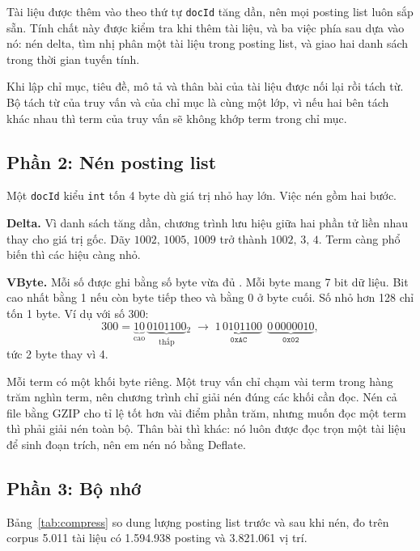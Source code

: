 \documentclass[9pt,twocolumn,a4paper]{extarticle}
\newcommand{\code}[1]{\texttt{#1}}
\newcommand{\srcref}[1]{\par\noindent\fcolorbox{red}{white}{\footnotesize\textbf{Mã nguồn: Listing~\ref{#1} (Phụ lục~\ref{app:code}).}}\par\vspace{3pt}}
\begin{document}
Tài liệu được thêm vào theo thứ tự \code{docId} tăng dần, nên mọi posting list luôn sắp sẵn. Tính chất này được kiểm tra khi thêm tài liệu, và ba việc phía sau dựa vào nó: nén delta, tìm nhị phân một tài liệu trong posting list, và giao hai danh sách trong thời gian tuyến tính.

Khi lập chỉ mục, tiêu đề, mô tả và thân bài của tài liệu được nối lại rồi tách từ. Bộ tách từ của truy vấn và của chỉ mục là cùng một lớp, vì nếu hai bên tách khác nhau thì term của truy vấn sẽ không khớp term trong chỉ mục.

\subsection{Phần 2: Nén posting list}
\label{sec:vbyte}
Một \code{docId} kiểu \code{int} tốn 4 byte dù giá trị nhỏ hay lớn. Việc nén gồm hai bước.

\textbf{Delta.} Vì danh sách tăng dần, chương trình lưu hiệu giữa hai phần tử liền nhau thay cho giá trị gốc. Dãy $1002,\,1005,\,1009$ trở thành $1002,\,3,\,4$. Term càng phổ biến thì các hiệu càng nhỏ.

\textbf{VByte.} Mỗi số được ghi bằng số byte vừa đủ \cite{manning2008ir}. Mỗi byte mang 7 bit dữ liệu. Bit cao nhất bằng 1 nếu còn byte tiếp theo và bằng 0 ở byte cuối. Số nhỏ hơn 128 chỉ tốn 1 byte. Ví dụ với số 300:
\begin{equation}
300=\underbrace{10}_{\text{cao}}\,\underbrace{0101100}_{\text{thấp}}{}_2
\;\longrightarrow\;
\underbrace{1\,0101100}_{\code{0xAC}}\ \ \underbrace{0\,0000010}_{\code{0x02}},
\label{eq:vbyte}
\end{equation}
tức 2 byte thay vì 4.

\srcref{lst:vbyte}

Mỗi term có một khối byte riêng. Một truy vấn chỉ chạm vài term trong hàng trăm nghìn term, nên chương trình chỉ giải nén đúng các khối cần đọc. Nén cả file bằng GZIP cho tỉ lệ tốt hơn vài điểm phần trăm, nhưng muốn đọc một term thì phải giải nén toàn bộ. Thân bài thì khác: nó luôn được đọc trọn một tài liệu để sinh đoạn trích, nên em nén nó bằng Deflate.

\subsection{Phần 3: Bộ nhớ}
Bảng~\ref{tab:compress} so dung lượng posting list trước và sau khi nén, đo trên corpus 5.011 tài liệu có 1.594.938 posting và 3.821.061 vị trí.
\end{document}
